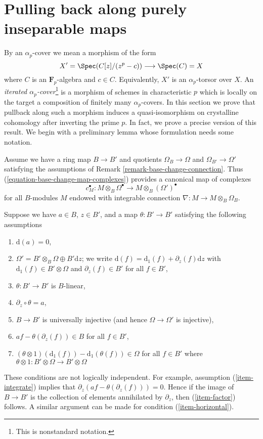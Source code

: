 \section{Pulling back along purely inseparable maps}
\label{section-pull-back-along-pth-root}

\noindent
By an $\alpha_p$-cover we mean a morphism of the form
$$
X' = \Spec(C[z]/(z^p - c)) \longrightarrow \Spec(C) = X
$$
where $C$ is an $\mathbf{F}_p$-algebra and $c \in C$. Equivalently,
$X'$ is an $\alpha_p$-torsor over $X$. An {\it iterated
$\alpha_p$-cover}\footnote{This is nonstandard notation.}
is a morphism of schemes in characteristic
$p$ which is locally on the target a composition of finitely many
$\alpha_p$-covers. In this section we prove that pullback along
such a morphism induces a quasi-isomorphism on crystalline cohomology
after inverting the prime $p$. In fact, we prove a precise version
of this result. We begin with a preliminary lemma whose formulation
needs some notation.

\medskip\noindent
Assume we have a ring map $B \to B'$ and quotients $\Omega_B \to \Omega$ and
$\Omega_{B'} \to \Omega'$ satisfying the assumptions of
Remark \ref{remark-base-change-connection}.
Thus (\ref{equation-base-change-map-complexes}) provides a
canonical map of complexes
$$
c_M^\bullet :
M \otimes_B \Omega^\bullet
\longrightarrow
M \otimes_B (\Omega')^\bullet
$$
for all $B$-modules $M$ endowed with integrable connection
$\nabla : M \to M \otimes_B \Omega_B$.

\medskip\noindent
Suppose we have $a \in B$, $z \in B'$, and a map $\theta : B' \to B'$
satisfying the following assumptions
\begin{enumerate}
\item
\label{item-d-a-zero}
$\text{d}(a) = 0$,
\item
\label{item-direct-sum}
$\Omega' = B' \otimes_B \Omega \oplus B'\text{d}z$; we write
$\text{d}(f) = \text{d}_1(f) + \partial_z(f) \text{d}z$
with $\text{d}_1(f) \in B' \otimes \Omega$ and $\partial_z(f) \in B'$
for all $f \in B'$,
\item
\label{item-theta-linear}
$\theta : B' \to B'$ is $B$-linear,
\item
\label{item-integrate}
$\partial_z \circ \theta = a$,
\item
\label{item-injective}
$B \to B'$ is universally injective (and hence $\Omega \to \Omega'$
is injective),
\item
\label{item-factor}
$af - \theta(\partial_z(f)) \in B$ for all $f \in B'$,
\item
\label{item-horizontal}
$(\theta \otimes 1)(\text{d}_1(f)) - \text{d}_1(\theta(f)) \in \Omega$
for all $f \in B'$ where
$\theta \otimes 1 : B' \otimes \Omega \to B' \otimes \Omega$
\end{enumerate}
These conditions are not logically independent.
For example, assumption (\ref{item-integrate}) implies
that $\partial_z(af - \theta(\partial_z(f))) = 0$.
Hence if the image of $B \to B'$ is the collection of
elements annihilated by $\partial_z$, then (\ref{item-factor})
follows. A similar argument can be made for condition (\ref{item-horizontal}).

